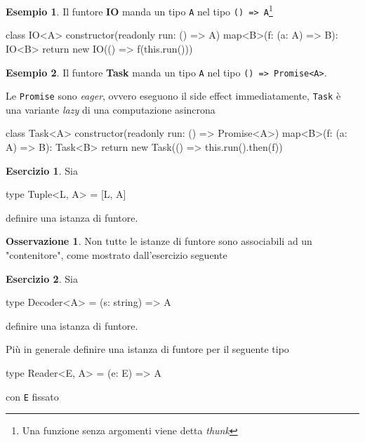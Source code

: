 \documentclass[12pt]{article}
\theoremstyle{definition}
\newtheorem{example}{Esempio}[section]
\newtheorem{exercise}{Esercizio}[section]
\newtheorem{observation}{Osservazione}[section]
\newenvironment{code}
  {\vspace{0.5cm} \VerbatimEnvironment\begin{typescriptcode}}
  {\end{typescriptcode} \vspace{0.2cm}}
\begin{document}
\begin{example}
Il funtore \textbf{IO} manda un tipo \texttt{A} nel tipo \texttt{() => A}\footnote{Una funzione senza argomenti viene detta \emph{thunk}}

\begin{code}
class IO<A> {
  constructor(readonly run: () => A) {}
  map<B>(f: (a: A) => B): IO<B> {
    return new IO(() => f(this.run()))
  }
}
\end{code}
\end{example}

\begin{example}
Il funtore \textbf{Task} manda un tipo \texttt{A} nel tipo \texttt{() => Promise<A>}.

Le \texttt{Promise} sono \emph{eager}, ovvero eseguono il side effect immediatamente, \texttt{Task} è una variante \emph{lazy}
di una computazione asincrona

\begin{code}
class Task<A> {
  constructor(readonly run: () => Promise<A>) {}
  map<B>(f: (a: A) => B): Task<B> {
    return new Task(() => this.run().then(f))
  }
}
\end{code}
\end{example}

\begin{exercise}
Sia

\begin{code}
type Tuple<L, A> = [L, A]
\end{code}

definire una istanza di funtore.
\end{exercise}

\begin{observation}
Non tutte le istanze di funtore sono associabili ad un "contenitore", come mostrato dall'esercizio seguente
\end{observation}

\begin{exercise}
Sia

\begin{code}
type Decoder<A> = (s: string) => A
\end{code}

definire una istanza di funtore.

Più in generale definire una istanza di funtore per il seguente tipo

\begin{code}
type Reader<E, A> = (e: E) => A
\end{code}

con \texttt{E} fissato

\end{exercise}
\end{document}
